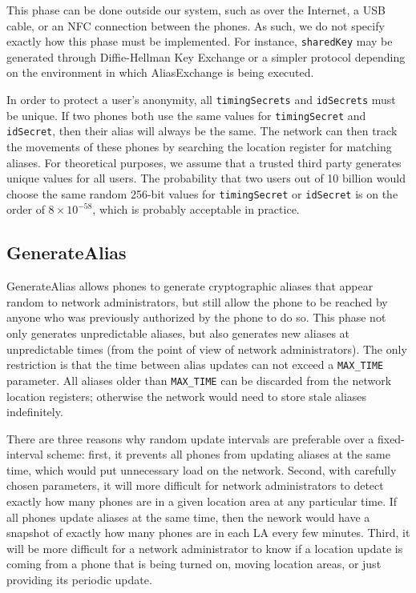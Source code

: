 \documentclass[11pt]{article}
\begin{document}
This phase can be done outside our system, such as over the Internet, a USB cable, or an NFC connection between the phones. As such, we do not specify exactly how this phase must be implemented. For instance, \texttt{sharedKey} may be generated through Diffie-Hellman Key Exchange \cite{diffie1976new} or a simpler protocol depending on the environment in which AliasExchange is being executed. 

In order to protect a user's anonymity, all \texttt{timingSecrets} and \texttt{idSecrets} must be unique. If two phones both use the same values for \texttt{timingSecret} and \texttt{idSecret}, then their alias will always be the same. The network can then track the movements of these phones by searching the location register for matching aliases. For theoretical purposes, we assume that a trusted third party generates unique values for all users. The probability that two users out of 10 billion would choose the same random 256-bit values for \texttt{timingSecret} or \texttt{idSecret} is on the order of $8 \times 10^{-58}$, which is probably acceptable in practice.

\subsection{GenerateAlias}
GenerateAlias allows phones to generate cryptographic aliases that appear random to network administrators, but still allow the phone to be reached by anyone who was previously authorized by the phone to do so. This phase not only generates unpredictable aliases, but also generates new aliases at unpredictable times (from the point of view of network administrators). The only restriction is that the time between alias updates can not exceed a \texttt{MAX_TIME} parameter. All aliases older than \texttt{MAX_TIME} can be discarded from the network location registers; otherwise the network would need to store stale aliases indefinitely. 

There are three reasons why random update intervals are preferable over a fixed-interval scheme: first, it prevents all phones from updating aliases at the same time, which would put unnecessary load on the network. Second, with carefully chosen parameters, it will more difficult for network administrators to detect exactly how many phones are in a given location area at any particular time. If all phones update aliases at the same time, then the nework would have a snapshot of exactly how many phones are in each LA every few minutes. Third, it will be more difficult for a network administrator to know if a location update is coming from a phone that is being turned on, moving location areas, or just providing its periodic update. 
\end{document}
